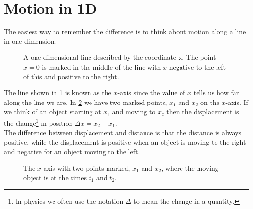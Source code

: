 \documentclass[a4paper,12pt]{book}
\begin{document}
\section{Motion in 1D}
The easiest way to remember the difference is to think about motion along a line in one dimension.\\

\begin{figure}[ht]
    \centering
    \caption{A one dimensional line described by the coordinate x. The point $x=0$ is marked in the middle of the line with $x$ negative to the left of this and positive to the right.}
    \label{fig: x-axis fig}
\end{figure}

The line shown in \cref{fig: x-axis fig} is known as the $x$-axis since the value of $x$ tells us how far along the line we are. In \cref{fig: x-axis fig2} we have two marked points, $x_{1}$ and $x_{2}$ on the $x$-axis. If we think of an object starting at $x_{1}$ and moving to $x_{2}$ then the displacement is the change\footnote{In physics we often use the notation $\Delta$ to mean the change in a quantity.} in position $\Delta x =x_{2}-x_{1}$.\\

The difference between displacement and distance is that the distance is always positive, while the displacement is positive when an object is moving to the right and negative for an object moving to the left.\\

\begin{figure}[ht]
    \centering
    \caption{The $x$-axis with two points marked, $x_{1}$ and $x_{2}$, where the moving object is at the times $t_{1}$ and $t_{2}$.}
    \label{fig: x-axis fig2}
\end{figure}
\end{document}
